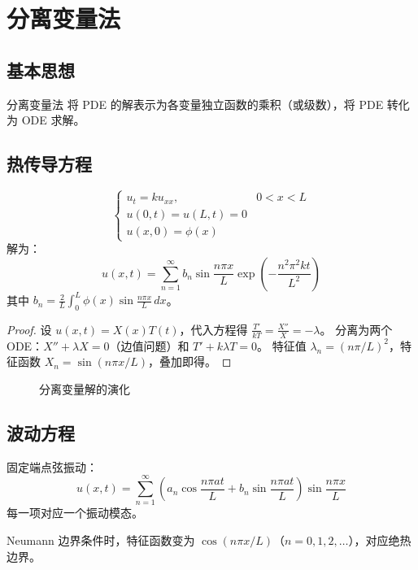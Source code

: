 ﻿\chapter{分离变量法}

\section{基本思想}

\begin{mydefinition}{分离变量法}
将 PDE 的解表示为各变量独立函数的乘积（或级数），将 PDE 转化为 ODE 求解。
\end{mydefinition}

\section{热传导方程}

\begin{theorem}[分离变量解]
\[
\begin{cases}
u_t=ku_{xx},&0<x<L\\
u(0,t)=u(L,t)=0\\
u(x,0)=\phi(x)
\end{cases}
\]
解为：
\[
u(x,t)=\sum_{n=1}^{\infty}b_n\sin\frac{n\pi x}{L}\exp\left(-\frac{n^2\pi^2kt}{L^2}\right)
\]
其中 $b_n=\displaystyle\frac{2}{L}\int_0^L\phi(x)\sin\frac{n\pi x}{L}\,dx$。
\end{theorem}

\begin{proof}
设 $u(x,t)=X(x)T(t)$，代入方程得 $\frac{T'}{kT}=\frac{X''}{X}=-\lambda$。
分离为两个 ODE：$X''+\lambda X=0$（边值问题）和 $T'+k\lambda T=0$。
特征值 $\lambda_n=(n\pi/L)^2$，特征函数 $X_n=\sin(n\pi x/L)$，叠加即得。
\end{proof}

\begin{figure}[htbp]
\centering
{}
\caption{分离变量解的演化}
\end{figure}

\section{波动方程}

\begin{theorem}[驻波解]
固定端点弦振动：
\[
u(x,t)=\sum_{n=1}^{\infty}\left(a_n\cos\frac{n\pi at}{L}+b_n\sin\frac{n\pi at}{L}\right)\sin\frac{n\pi x}{L}
\]
每一项对应一个振动模态。
\end{theorem}

\begin{remark}
Neumann 边界条件时，特征函数变为 $\cos(n\pi x/L)$（$n=0,1,2,\ldots$），对应绝热边界。
\end{remark}
